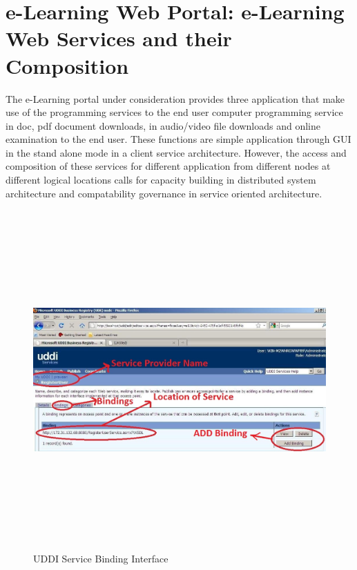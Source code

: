 \section{e-Learning Web Portal: e-Learning Web Services and their Composition}
The e-Learning portal under consideration provides three application that make use of the programming  services to the end user computer programming service in doc, pdf document downloads,
in audio/video file downloads and online examination to the end user. These functions are simple application through GUI in the stand alone
mode in a client service architecture. However, the access and composition of these services for different application from different nodes
at different logical locations calls for capacity building in distributed system architecture and compatability governance in service oriented architecture. 
 \begin{figure}[h!]
 \centering
 \includegraphics[width=16cm,height=13cm]{uddi_service_binding_interface.jpg}
 \caption{UDDI Service Binding Interface}
\end{figure} 
